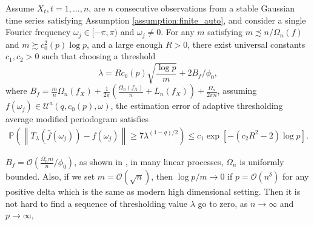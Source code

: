 \begin{prop}
\label{prop: gauss_prop}
Assume ${X}_t, t=1,\ldots,n$, are $n$ consecutive observations from a stable Gaussian time series satisfying Assumption \ref{assumption:finite_auto}, and consider a single Fourier frequency $\omega_j \in [-\pi, \pi)$ and $\omega_j \neq 0$. 
For any $m $ satisfying $m \precsim n/ \Omega_n(f)$ and $m \succsim c_0^2(p)\log p$, and a large enough $R > 0$,  
there exist universal constants $c_1, c_2 > 0$ such that choosing a threshold 
\begin{equation}
\label{eq:threshold_value}
\lambda = R c_0(p)\sqrt{\frac{\log p}{m}} +2B_f/\phi_0, 
\end{equation}
where $B_f = \frac{m}{n}\Omega_n(f_X) + \frac{1}{2\pi}\left(\frac{\Omega_n(f_X)}{n}+L_n(f_X)\right) +\frac{\Omega_n}{2\pi n}$, 
assuming $f(\omega_j)\in \mathcal{U}^a(q, c_0(p), \omega)$, 
the estimation error of adaptive thresholding average modified periodogram satisfies 
\begin{equation}
\begin{aligned}
\mathbb{P}\left(\left\|T_{\lambda}(\hat{f}(\omega_j)) - f(\omega_j)\right\|\ge 7 \lambda^{(1-q)/2} \right)
\le c_1 \exp\left[-(c_2 R^2-2)\log p\right]. \nonumber
\end{aligned}
\end{equation}
\end{prop}

\begin{remark}
$B_f = \mathcal{O}(\frac{\Omega_n m}{n}/\phi_0)$, as shown in \cite{sun2018large}, in many linear processes, $\Omega_n$ is uniformly bounded. Also, if we set $m=\mathcal{O}(\sqrt{n})$, then $\log p/m \rightarrow 0$ if $p = \mathcal{O}(n^\delta)$ for any positive delta which is the same as modern high dimensional setting. Then it is not hard to find a sequence of thresholding value $\lambda$ go to zero, as $n\rightarrow \infty$ and $p\rightarrow \infty$, 
\end{remark}











